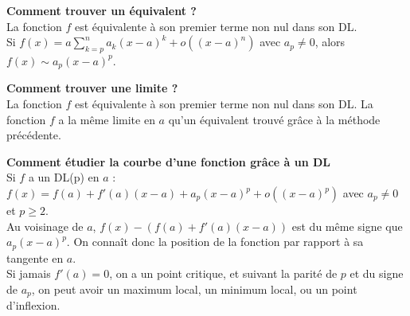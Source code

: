 




\begin{Meth}\textbf{Comment trouver un équivalent ?}\\

La fonction \(f\) est équivalente à son premier terme non nul dans son DL. \\
Si \(f(x) = a \sum_{k=p}^{n} a_k (x - a)^k + o\left((x - a)^n\right)\) avec \(a_p \neq 0\), alors \(f(x) \sim a_p (x - a)^p\).\\
\end{Meth}



\begin{Meth}\textbf{Comment trouver une limite ?}\\

La fonction \(f\) est équivalente à son premier terme non nul dans son DL. La fonction \(f\) a la même limite en \(a\) qu'un équivalent trouvé grâce à la méthode précédente.\\

\end{Meth}


\begin{Meth}\textbf{Comment étudier la courbe d'une fonction grâce à un DL}\\
Si \(f\) a un DL(p) en \(a\) : \(f(x) = f(a) + f'(a)(x - a) + a_p (x - a)^p + o\left((x - a)^p\right)\) avec \(a_p \neq 0\) et \(p \geq 2\).\\

Au voisinage de \(a\), \(f(x) - \left(f(a) + f'(a)(x - a)\right)\) est du même signe que \(a_p(x - a)^p\). On connaît donc la position de la fonction par rapport à sa tangente en \(a\).\\

Si jamais \(f'(a) = 0\), on a un point critique, et suivant la parité de \(p\) et du signe de \(a_p\), on peut avoir un maximum local, un minimum local, ou un point d'inflexion.\\
\end{Meth}

